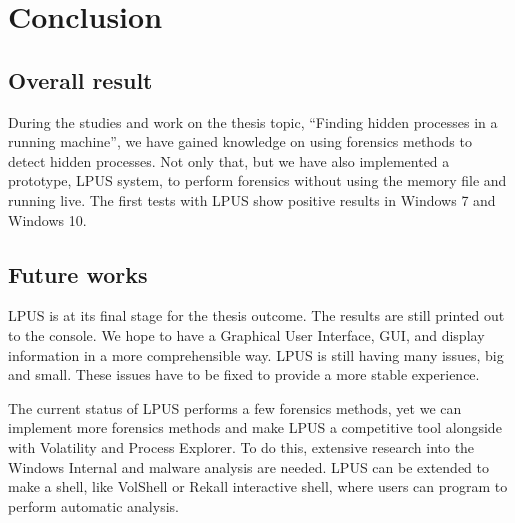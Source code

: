 \chapter[Conclusion]{Conclusion}

\section[Overall result]{Overall result}

During the studies and work on the thesis topic, ``Finding hidden processes in
a running machine'', we have gained knowledge on using forensics methods to
detect hidden processes. Not only that, but we have also implemented a
prototype, LPUS system, to perform forensics without using the memory file and
running live. The first tests with LPUS show positive results in Windows 7 and
Windows 10.

\section[Future works]{Future works}

LPUS is at its final stage for the thesis outcome. The results are still
printed out to the console. We hope to have a Graphical User Interface, GUI,
and display information in a more comprehensible way. LPUS is still having many
issues, big and small. These issues have to be fixed to provide a more stable
experience.

The current status of LPUS performs a few forensics methods, yet we can
implement more forensics methods and make LPUS a competitive tool alongside
with Volatility and Process Explorer. To do this, extensive research into the
Windows Internal and malware analysis are needed.  LPUS can be extended to make
a shell, like VolShell or Rekall interactive shell, where users can program to
perform automatic analysis.
